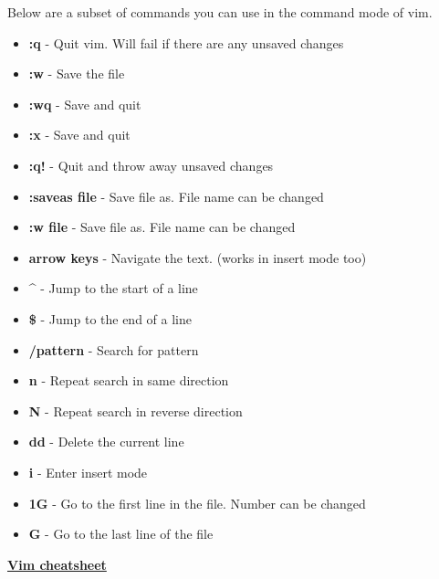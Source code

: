 \documentclass[
  letterpaper,
  DIV=11,
  numbers=noendperiod]{scrreprt}
\providecommand{\tightlist}{%
  \setlength{\itemsep}{0pt}\setlength{\parskip}{0pt}}\usepackage{longtable,booktabs,array}
\begin{document}
Below are a subset of commands you can use in the command mode of vim.

\begin{itemize}
\tightlist
\item
  \textbf{:q} - Quit vim. Will fail if there are any unsaved changes
\item
  \textbf{:w} - Save the file
\item
  \textbf{:wq} - Save and quit
\item
  \textbf{:x} - Save and quit
\item
  \textbf{:q!} - Quit and throw away unsaved changes
\item
  \textbf{:saveas file} - Save file as. File name can be changed
\item
  \textbf{:w file} - Save file as. File name can be changed
\item
  \textbf{arrow keys} - Navigate the text. (works in insert mode too)
\item
  \textbf{\^{}} - Jump to the start of a line
\item
  \textbf{\$} - Jump to the end of a line
\item
  \textbf{/pattern} - Search for pattern
\item
  \textbf{n} - Repeat search in same direction
\item
  \textbf{N} - Repeat search in reverse direction
\item
  \textbf{dd} - Delete the current line
\item
  \textbf{i} - Enter insert mode
\item
  \textbf{1G} - Go to the first line in the file. Number can be changed
\item
  \textbf{G} - Go to the last line of the file
\end{itemize}

\href{https://vim.rtorr.com/}{\textbf{Vim cheatsheet}}
\end{document}
